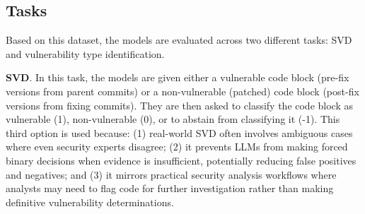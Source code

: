 \documentclass[lettersize,journal]{IEEEtran}
\begin{document}
\begin{table}[!t]
\centering
\caption{\gls{CWE} pillar distribution across PBD and LFD.}
\label{table:cwe-pillars-combined}
\small
\renewcommand{\arraystretch}{1.1}
\end{table}


\subsection{Tasks}
\label{section:tasks}

Based on this dataset, the models are evaluated across two different tasks: \gls{SVD} and vulnerability type identification.

\textbf{\gls{SVD}}. In this task, the models are given either a vulnerable code block (pre-fix versions from parent commits) or a non-vulnerable (patched) code block (post-fix versions from fixing commits). They are then asked to classify the code block as vulnerable (1), non-vulnerable (0), or to abstain from classifying it (-1). This third option is used because: (1) real-world \gls{SVD} often involves ambiguous cases where even security experts disagree; (2) it prevents \glspl{LLM} from making forced binary decisions when evidence is insufficient, potentially reducing false positives and negatives; and (3) it mirrors practical security analysis workflows where analysts may need to flag code for further investigation rather than making definitive vulnerability determinations. 
\end{document}

